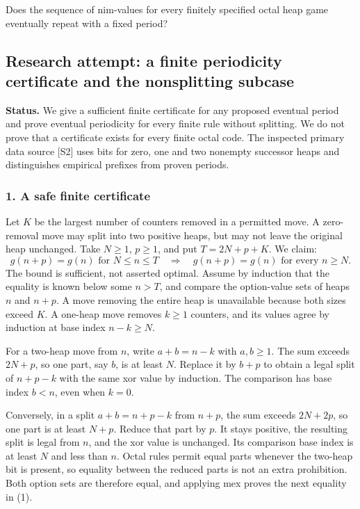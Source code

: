 \documentclass[11pt,a4paper]{article}
\begin{document}
Does the sequence of nim-values for every finitely specified octal heap game eventually repeat with a fixed period?

\subsection{Research attempt: a finite periodicity certificate and the nonsplitting subcase}
\textbf{Status.} We give a sufficient finite certificate for any proposed eventual period and prove eventual periodicity for every finite rule without splitting. We do not prove that a certificate exists for every finite octal code. The inspected primary data source [S2] uses bits for zero, one and two nonempty successor heaps and distinguishes empirical prefixes from proven periods.

\subsubsection{1. A safe finite certificate}
Let $K$ be the largest number of counters removed in a permitted move. A zero-removal move may split into two positive heaps, but may not leave the original heap unchanged. Take $N\geq1$, $p\geq1$, and put $T=2N+p+K$. We claim:
\[g(n+p)=g(n)\text{ for }N\leq n\leq T
\quad\Longrightarrow\quad g(n+p)=g(n)\text{ for every }n\geq N.\tag{1}\]
The bound is sufficient, not asserted optimal. Assume by induction that the equality is known below some $n>T$, and compare the option-value sets of heaps $n$ and $n+p$. A move removing the entire heap is unavailable because both sizes exceed $K$. A one-heap move removes $k\geq1$ counters, and its values agree by induction at base index $n-k\geq N$.

For a two-heap move from $n$, write $a+b=n-k$ with $a,b\geq1$. The sum exceeds $2N+p$, so one part, say $b$, is at least $N$. Replace it by $b+p$ to obtain a legal split of $n+p-k$ with the same xor value by induction. The comparison has base index $b<n$, even when $k=0$.

Conversely, in a split $a+b=n+p-k$ from $n+p$, the sum exceeds $2N+2p$, so one part is at least $N+p$. Reduce that part by $p$. It stays positive, the resulting split is legal from $n$, and the xor value is unchanged. Its comparison base index is at least $N$ and less than $n$. Octal rules permit equal parts whenever the two-heap bit is present, so equality between the reduced parts is not an extra prohibition. Both option sets are therefore equal, and applying mex proves the next equality in (1).
\end{document}
